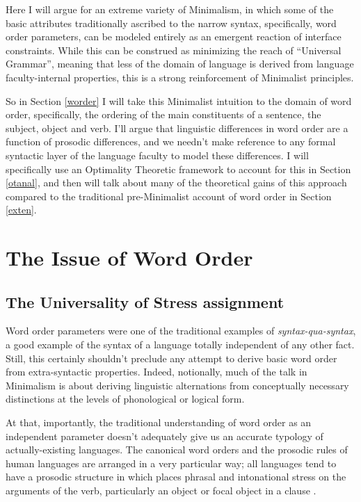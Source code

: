 \documentclass{article}
\begin{document}
Here I will argue for an extreme variety of Minimalism, in which some of the basic attributes traditionally ascribed to the narrow syntax, specifically, word order parameters, can be modeled entirely as an emergent reaction of interface constraints.
While this can be construed as minimizing the reach of ``Universal Grammar'', meaning that less of the domain of language is derived from language faculty-internal properties, this is a strong reinforcement of Minimalist principles.

So in Section \ref{worder} I will take this Minimalist intuition to the domain of word order, specifically, the ordering of the main constituents of a sentence, the subject, object and verb.
I'll argue that linguistic differences in word order are a function of prosodic differences, and we needn't make reference to any formal syntactic layer of the language faculty to model these differences.
I will specifically use an Optimality Theoretic framework to account for this in Section \ref{otanal}, and then will talk about many of the theoretical gains of this approach compared to the traditional pre-Minimalist account of word order in Section \ref{exten}.

\section{The Issue of Word Order\label{worder}}

\subsection{The Universality of Stress assignment}

Word order parameters were one of the traditional examples of \textit{syntax-qua-syntax}, a good example of the syntax of a language totally independent of any other fact.
Still, this certainly shouldn't preclude any attempt to derive basic word order from extra-syntactic properties.
Indeed, notionally, much of the talk in Minimalism is about deriving linguistic alternations from conceptually necessary distinctions at the levels of phonological or logical form.

At that, importantly, the traditional understanding of word order as an independent parameter doesn't adequately give us an accurate typology of actually-existing languages.
The canonical word orders and the prosodic rules of human languages are arranged in a very particular way; all languages tend to have a prosodic structure in which places phrasal and intonational stress on the arguments of the verb, particularly an object or focal object in a clause \parencite{gundel88}.
\end{document}

